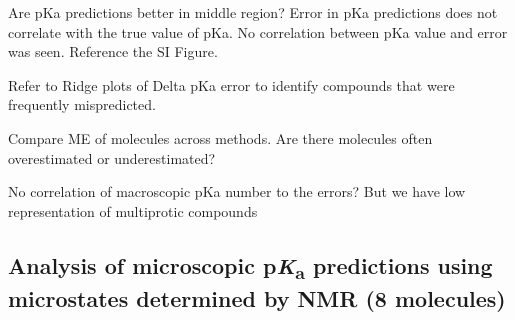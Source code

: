\documentclass[9pt,lineno,final]{elife}
\newcommand{\pKa}{p\textit{K}\textsubscript{a}}
\begin{document}
Are pKa predictions better in middle region? Error in pKa predictions does not correlate with the true value of pKa.
No correlation between pKa value and error was seen.
Reference the SI Figure.

Refer to Ridge plots of Delta pKa error to identify compounds that were frequently mispredicted.

Compare ME of molecules across methods.
Are there molecules often overestimated or underestimated?

No correlation of macroscopic pKa number to the errors? But we have low representation of multiprotic compounds








\subsection{Analysis of microscopic \pKa{} predictions using microstates determined by NMR (8 molecules)}
\end{document}
